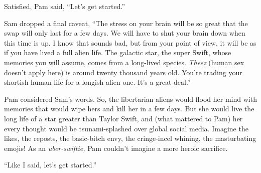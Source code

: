 Satisfied, Pam said, ``Let's get started.''

Sam dropped a final caveat, ``The stress on your brain will be so great
that the swap will only last for a few days. We will have to shut your
brain down when this time is up. I know that sounds bad, but from your
point of view, it will be as if you have lived a full alien life. The
galactic star, the super Swift, whose memories you will assume, comes
from a long-lived species. \emph{Theez} (human sex doesn't apply here)
is around twenty thousand years old. You're trading your shortish human
life for a longish alien one. It's a great deal.''

Pam considered Sam's words. So, the libertarian aliens would flood her
mind with memories that would wipe hers and kill her in a few days. But
she would live the long life of a star greater than Taylor Swift, and
(what mattered to Pam) her every thought would be tsunami-splashed over
global social media. Imagine the likes, the reposts, the basic-bitch
envy, the cringe-incel whining, the masturbating emojis! As an
\emph{uber-swiftie,} Pam couldn't imagine a more heroic sacrifice.

``Like I said, let's get started.''



%

